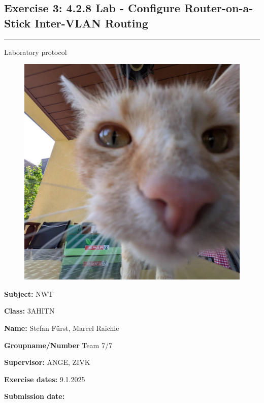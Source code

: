 \documentclass[a4paper]{article}
\newcommand{\abc}{\hfill \break}
\begin{document}
% 
\pagestyle{oida}
\subsection*{Exercise 3: 4.2.8 Lab - Configure Router-on-a-Stick Inter-VLAN Routing}
\par\noindent\rule{\textwidth}{0.4pt}

Laboratory protocol

\begin{figure}[h]
	\includegraphics[scale=0.2]{images/mika.jpeg}
	\centering
\end{figure}

\vspace*{\fill}
\textbf{Subject:}	NWT\abc

\textbf{Class:}	3AHITN\abc

\textbf{Name:}	Stefan Fürst, Marcel Raichle\abc

\textbf{Groupname/Number} Team 7/7\abc

\textbf{Supervisor:} 	ANGE, ZIVK\abc

\textbf{Exercise dates:} 9.1.2025	\abc

\textbf{Submission date:}\abc

\abc \abc \abc \abc

\newpage
\tableofcontents
\end{document}
